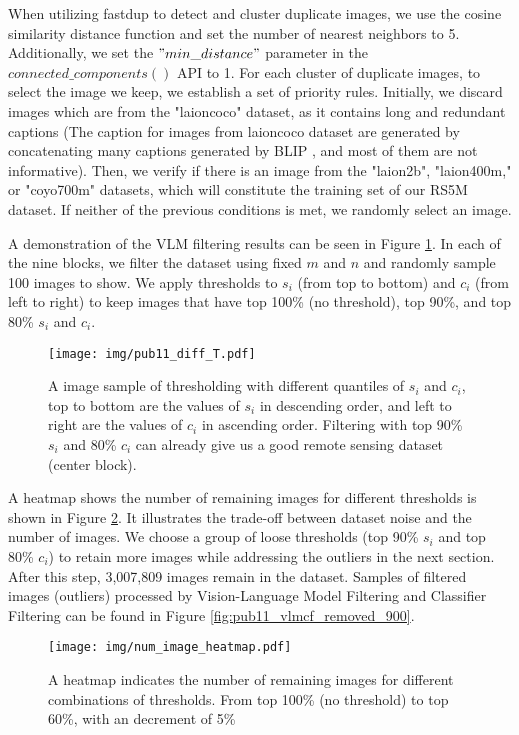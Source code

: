 \documentclass[journal]{IEEEtran}
\begin{document}
When utilizing fastdup to detect and cluster duplicate images, we use the cosine similarity distance function and set the number of nearest neighbors to 5. Additionally, we set the $"min\_distance"$ parameter in the $connected\_components()$ API to 1. For each cluster of duplicate images, to select the image we keep, we establish a set of priority rules. Initially, we discard images which are from the "laioncoco" dataset, as it contains long and redundant captions (The caption for images from laioncoco dataset are generated by concatenating many captions generated by BLIP \cite{blip}, and most of them are not informative). Then, we verify if there is an image from the "laion2b", "laion400m," or "coyo700m" datasets, which will constitute the training set of our RS5M dataset. If neither of the previous conditions is met, we randomly select an image.

A demonstration of the VLM filtering results can be seen in Figure \ref{fig:grid_random}. In each of the nine blocks, we filter the dataset using fixed $m$ and $n$ and randomly sample 100 images to show. We apply thresholds to $s_i$ (from top to bottom) and $c_i$ (from left to right) to keep images that have top 100\% (no threshold), top 90\%, and top 80\% $s_i$ and $c_i$. 

\begin{figure}[H]
    \centering
    \texttt{[image: img/pub11\_diff\_T.pdf]}
    \caption{A image sample of thresholding with different quantiles of $s_i$ and $c_i$, top to bottom are the values of $s_i$ in descending order, and left to right are the values of $c_i$ in ascending order. Filtering with top 90\% $s_i$ and 80\% $c_i$ can already give us a good remote sensing dataset (center block).}
    \label{fig:grid_random}
\end{figure}

A heatmap shows the number of remaining images for different thresholds is shown in Figure \ref{fig:num_image_heatmap}. It illustrates the trade-off between dataset noise and the number of images. We choose a group of loose thresholds (top 90\% $s_i$ and top 80\% $c_i$) to retain more images while addressing the outliers in the next section. After this step, 3,007,809 images remain in the dataset. Samples of filtered images (outliers) processed by Vision-Language Model Filtering and Classifier Filtering can be found in Figure \ref{fig:pub11_vlmcf_removed_900}.

\begin{figure}[htbp]
    \centering
    \texttt{[image: img/num\_image\_heatmap.pdf]}
    \caption{A heatmap indicates the number of remaining images for different combinations of thresholds. From top 100\% (no threshold) to top 60\%, with an decrement of 5\%}
    \label{fig:num_image_heatmap}
\end{figure}
\end{document}
